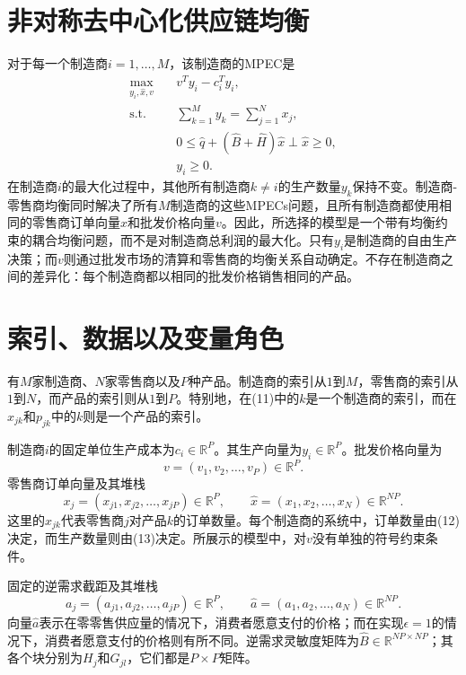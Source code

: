 \documentclass{article}
\begin{document}
\section*{非对称去中心化供应链均衡}
对于每一个制造商$i=1,\ldots,M$，该制造商的MPEC是
\begin{align}
\max_{y_i,\hat{x},v}\quad &v^T y_i-c_i^T y_i, \tag{10}\\
\text{s.t.}\quad &\sum_{k=1}^{M}y_k=\sum_{j=1}^{N}x_j, \tag{11}\\
&0\leq\hat{q}+(\hat{B}+\hat{H})\hat{x}\perp\hat{x}\geq0, \tag{12}\\
&y_i\geq0. \tag{13}
\end{align}
在制造商$i$的最大化过程中，其他所有制造商$k\ne i$的生产数量$y_k$保持不变。制造商-零售商均衡同时解决了所有$M$制造商的这些MPECs问题，且所有制造商都使用相同的零售商订单向量$\hat{x}$和批发价格向量$v$。因此，所选择的模型是一个带有均衡约束的耦合均衡问题，而不是对制造商总利润的最大化。只有$y_i$是制造商的自由生产决策；而$v$则通过批发市场的清算和零售商的均衡关系自动确定。不存在制造商之间的差异化：每个制造商都以相同的批发价格销售相同的产品。

\section*{索引、数据以及变量角色}
有$M$家制造商、$N$家零售商以及$P$种产品。制造商的索引从$1$到$M$，零售商的索引从$1$到$N$，而产品的索引则从$1$到$P$。特别地，在(11)中的$k$是一个制造商的索引，而在$x_{jk}$和$p_{jk}$中的$k$则是一个产品的索引。

制造商$i$的固定单位生产成本为$c_i\in\mathbb{R}^{P}$。其生产向量为$y_i\in\mathbb{R}^{P}$。批发价格向量为
\[
v=(v_1,v_2,\ldots,v_P)\in\mathbb{R}^{P}.
\]
零售商订单向量及其堆栈
\[
x_j=(x_{j1},x_{j2},\ldots,x_{jP})\in\mathbb{R}^{P},
\qquad
\hat{x}=(x_1,x_2,\ldots,x_N)\in\mathbb{R}^{NP}.
\]
这里的$x_{jk}$代表零售商$j$对产品$k$的订单数量。每个制造商的系统中，订单数量由(12)决定，而生产数量则由(13)决定。所展示的模型中，对$v$没有单独的符号约束条件。

固定的逆需求截距及其堆栈
\[
a_j=(a_{j1},a_{j2},\ldots,a_{jP})\in\mathbb{R}^{P},
\qquad
\hat{a}=(a_1,a_2,\ldots,a_N)\in\mathbb{R}^{NP}.
\]
向量$\hat{a}$表示在零零售供应量的情况下，消费者愿意支付的价格；而在实现$\epsilon=1$的情况下，消费者愿意支付的价格则有所不同。逆需求灵敏度矩阵为$\hat{B}\in\mathbb{R}^{NP\times NP}$；其各个块分别为$H_j$和$G_{jl}$，它们都是$P\times P$矩阵。
\end{document}
